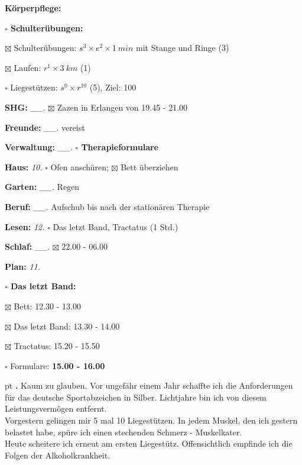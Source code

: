 \documentclass[10pt,a4paper]{article}
\newcounter{notec}
\newcommand\notep[1]{%
  \stepcounter{notec}
  \vskip #1pt
  {\bf\arabic{notec}.}
}
\newcommand\prop[1] {{\color {alizarin} {\bf #1}}}        %
\newcommand\draf[1] {{\color {amber(sae/ece)} {\bf #1}}}  %
\newcommand\mand[1] {{\color {burntorange} {\bf #1}}}     %
\newcommand\topvskip {\vskip 8pt}
\newcommand\topspace{\vskip -15pt \hskip 20pt}
\newcommand\bottomspace{\vskip 4pt}
\newcommand\n[1] { {\sl #1.} \hskip 5pt }
\begin{document}
\begin{mdframed}[style=daystyle]
\begin{labeling}{{\mand {Körperpflege:}}}
\begin{minipage}{0.75\textwidth}
\begin{labeling}{\prop {$\square$ {Schulterübungen:}}}
      \item[$\boxtimes$ Schulterübungen:] $s^3 \times e^2 \times 1\ min$ mit Stange und Ringe (3)
      \item[$\boxtimes$ Laufen:]          $r^1 \times 3\ km$ (1)
      \item[$\square$ Liegestützen:]    $s^0 \times r^{10}$ (5), Ziel: 100
      \end{labeling}
    \end{minipage}
    \bottomspace        
  \item[{\mand {SHG:}}]          \n{\_\_} $\boxtimes$ Zazen in Erlangen von 19.45 - 21.00
  \item[{\mand {Freunde:}}]      \n{\_\_} vereist
  \item[{\mand {Verwaltung:}}]   \n{\_\_} {\prop {$\square$ Therapieformulare}}
  \item[{\mand {Haus:}}]           \n{10} $\square$ Ofen anschüren; $\boxtimes$ Bett überziehen
  \item[{\mand {Garten:}}]       \n{\_\_} Regen
  \item[{\mand {Beruf:}}]        \n{\_\_} Aufschub bis nach der stationären Therapie
  \item[{\mand {Lesen:}}]          \n{12} $\square$ Das letzt Band, Tractatus (1 Std.)
  \item[{\mand {Schlaf:}}]       \n{\_\_} $\boxtimes$ 22.00 - 06.00
  \item[{\mand {Plan:}}]           \n{11}
    \topspace
    \begin{minipage}{0.75\textwidth}  
      \begin{labeling}{\prop {$\square$ {Das letzt Band:}}} 
        \setlength\itemsep{-3pt}
      \item[$\boxtimes$ Bett:]           12.30 - 13.00
      \item[$\boxtimes$ Das letzt Band:] 13.30 - 14.00
      \item[$\boxtimes$ Tractatus:]      15.20 - 15.50
      \item[$\square$   Formulare:]      {\draf {15.00 - 16.00}}
      \end{labeling}
    \end{minipage}
    \bottomspace        
  \end{labeling}

  \topvskip

  \setcounter{notec}{0}

  \notep 0 Kaum zu glauben. Vor ungefähr einem Jahr schaffte ich die Anforderungen für
  das deutsche Sportabzeichen in Silber. Lichtjahre bin ich von diesem
  Leistungsvermögen entfernt. \\
  Vorgestern gelingen mir 5 mal 10 Liegestützen. In jedem Muskel, den ich
  gestern belastet habe, spüre ich einen stechenden Schmerz - Muskelkater. \\
  Heute scheitere ich erneut am ersten Liegestütz. Offensichtlich empfinde ich
  die Folgen der Alkoholkrankheit.


\end{mdframed}
\end{document}
